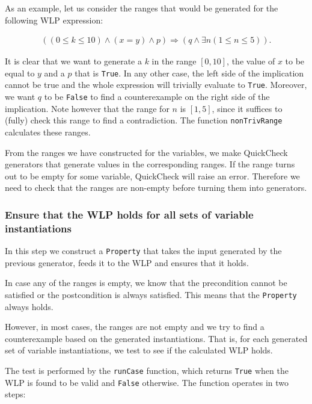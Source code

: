 \documentclass[a4paper]{article}
\begin{document}
As an example, let us consider the ranges that would be generated for the following WLP
expression:

\begin{align*}
	((0 \leq k \leq 10) \wedge (x = y) \wedge p) \Rightarrow (q \wedge \exists n (1 \leq n \leq 5)).
\end{align*}

It is clear that we want to generate a $k$ in the range $[0, 10]$, the value of
$x$ to be equal to $y$ and a $p$ that is \texttt{True}. In any other case, the
left side of the implication cannot be true and the whole expression will
trivially evaluate to \texttt{True}. Moreover, we want $q$ to be \texttt{False}
to find a counterexample on the right side of the implication. Note however that
the range for $n$ is $[1, 5]$, since it suffices to (fully) check this range to
find a contradiction. The function \texttt{nonTrivRange} calculates these
ranges.

From the ranges we have constructed for the variables, we make QuickCheck
generators that generate values in the corresponding ranges. If the range turns
out to be empty for some variable, QuickCheck will raise an error. Therefore
we need to check that the ranges are non-empty before turning them into generators.

\subsubsection*{Ensure that the WLP holds for all sets of variable instantiations}

In this step we construct a \texttt{Property} that takes the input generated by
the previous generator, feeds it to the WLP and ensures that it holds.

In case any of the ranges is empty, we know that the precondition cannot be
satisfied or the postcondition is always satisfied. This means that the
\texttt{Property} always holds.

However, in most cases, the ranges are not empty and we try to find a counterexample
based on the generated instantiations. That is, for each generated set of variable
instantiations, we test to see if the calculated WLP holds.

The test is performed by the \texttt{runCase} function, which returns \texttt{True}
when the WLP is found to be valid and \texttt{False} otherwise. The function
operates in two steps:
\end{document}
